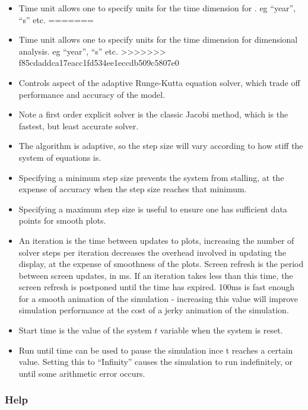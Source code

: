 \label{RungeKutta}
\begin{itemize}
<<<<<<< HEAD
\item Time unit allows one to specify units for the time dimension for
  . eg ``year'', ``s'' etc.
=======
\item Time unit allows one to specify units for the time dimension for dimensional
analysis. eg ``year'', ``s'' etc. 
>>>>>>> f85cdaddca17eacc1fd534ee1eccdb509c5807e0
\item Controls aspect of the adaptive Runge-Kutta equation solver, which
trade off performance and accuracy of the model. 
\item Note a first order explicit solver is the classic Jacobi method, which
is the fastest, but least accurate solver. 
\item The algorithm is adaptive, so the step size will vary according to
how stiff the system of equations is. 
\item Specifying a minimum step size prevents the system from stalling,
at the expense of accuracy when the step size reaches that minimum. 
\item Specifying a maximum step size is useful to ensure one has sufficient
data points for smooth plots. 
\item An iteration is the time between updates to plots, increasing the
number of solver steps per iteration decreases the overhead involved
in updating the display, at the expense of smoothness of the plots.
Screen refresh is the period between screen updates, in ms. If an
iteration takes less than this time, the screen refresh is postponed
until the time has expired. 100ms is fast enough for a smooth animation
of the simulation - increasing this value will improve simulation
performance at the cost of a jerky animation of the simulation. 
\item Start time is the value of the system $t$ variable when the system
is reset. 
\item Run until time can be used to pause the simulation ince t reaches
a certain value. Setting this to ``Infinity'' causes the simulation
to run indefinitely, or until some arithmetic error occurs. 
\end{itemize}

\subsubsection{Help}

\label{Help}

